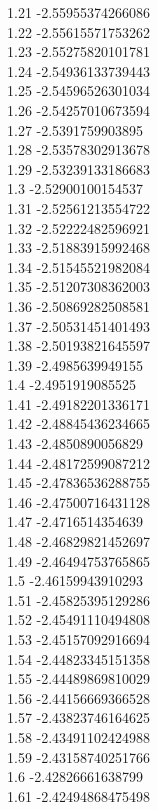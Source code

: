 {1.21	-2.55955374266086\\
1.22	-2.55615571753262\\
1.23	-2.55275820101781\\
1.24	-2.54936133739443\\
1.25	-2.54596526301034\\
1.26	-2.54257010673594\\
1.27	-2.5391759903895\\
1.28	-2.53578302913678\\
1.29	-2.53239133186683\\
1.3	-2.52900100154537\\
1.31	-2.52561213554722\\
1.32	-2.52222482596921\\
1.33	-2.51883915992468\\
1.34	-2.51545521982084\\
1.35	-2.51207308362003\\
1.36	-2.50869282508581\\
1.37	-2.50531451401493\\
1.38	-2.50193821645597\\
1.39	-2.4985639949155\\
1.4	-2.4951919085525\\
1.41	-2.49182201336171\\
1.42	-2.48845436234665\\
1.43	-2.4850890056829\\
1.44	-2.48172599087212\\
1.45	-2.47836536288755\\
1.46	-2.47500716431128\\
1.47	-2.4716514354639\\
1.48	-2.46829821452697\\
1.49	-2.46494753765865\\
1.5	-2.46159943910293\\
1.51	-2.45825395129286\\
1.52	-2.45491110494808\\
1.53	-2.45157092916694\\
1.54	-2.44823345151358\\
1.55	-2.44489869810029\\
1.56	-2.44156669366528\\
1.57	-2.43823746164625\\
1.58	-2.43491102424988\\
1.59	-2.43158740251766\\
1.6	-2.42826661638799\\
1.61	-2.42494868475498\\
}
